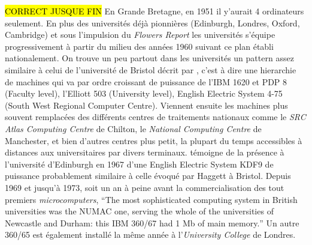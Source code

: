 


\hl{CORRECT JUSQUE FIN}
En Grande Bretagne, en 1951 il y'aurait 4 ordinateurs seulement. En plus des universités déjà pionnières (Edinburgh, Londres, Oxford, Cambridge) et sous l'impulsion du \textit{Flowers Report} les universités s'équipe progressivement à partir du milieu des années 1960 suivant ce plan établi nationalement. On trouve un peu partout dans les universités  un pattern assez similaire à celui de l'université de Bristol décrit par \textcite{Haggett1969}, c'est à dire une hierarchie de machines qui va par ordre croissant de puissance de l'IBM 1620 et PDP 8 (Faculty level), l'Elliott 503 (University level), English Electric System 4-75 (South West Regional Computer Centre). Viennent ensuite les machines plus souvent remplacées des différents centres de traitements nationaux comme le \textit{SRC Atlas Computing Centre} de Chilton, le \textit{National Computing Centre} de Manchester, et bien d'autres centres plus petit, la plupart du temps accessibles à distances aux universitaires par divers terminaux. \textcite{Rhind1989} témoigne de la présence à l'université d'Edinburgh en 1967 d'une English Electric System KDF9 de puissance probablement similaire à celle évoqué par Haggett à Bristol. Depuis 1969 et jusqu'à 1973, soit un an à peine avant la commercialisation des tout premiers \textit{microcomputers}, \foreignquote{english}{The most sophisticated computing system in British universities was the NUMAC one, serving the whole of the universities of Newcastle and Durham: this IBM 360/67 had 1 Mb of main memory.}  Un autre 360/65 est également installé la même année à l'\textit{University College} de Londres.


